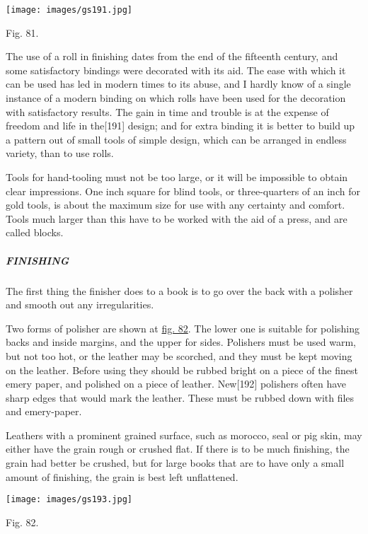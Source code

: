 \documentclass[
]{article}
\begin{document}
\protect\hypertarget{Fig_81}{}{}
\texttt{[image: images/gs191.jpg]}

Fig. 81.

The use of a roll in finishing dates from the end of the fifteenth
century, and some satisfactory bindings were decorated with its aid. The
ease with which it can be used has led in modern times to its abuse, and
I hardly know of a single instance of a modern binding on which rolls
have been used for the decoration with satisfactory results. The gain in
time and trouble is at the expense of freedom and life in
the{\protect\hypertarget{Page_191}{}{{[}191{]}}} design; and for extra
binding it is better to build up a pattern out of small tools of simple
design, which can be arranged in endless variety, than to use rolls.

Tools for hand-tooling must not be too large, or it will be impossible
to obtain clear impressions. One inch square for blind tools, or
three-quarters of an inch for gold tools, is about the maximum size for
use with any certainty and comfort. Tools much larger than this have to
be worked with the aid of a press, and are called blocks.

\hypertarget{finishing}{%
\subparagraph{FINISHING}\label{finishing}}

The first thing the finisher does to a book is to go over the back with
a polisher and smooth out any irregularities.

Two forms of polisher are shown at \protect\hyperlink{Fig_82}{fig. 82}.
The lower one is suitable for polishing backs and inside margins, and
the upper for sides. Polishers must be used warm, but not too hot, or
the leather may be scorched, and they must be kept moving on the
leather. Before using they should be rubbed bright on a piece of the
finest emery paper, and polished on a piece of leather.
New{\protect\hypertarget{Page_192}{}{{[}192{]}}} polishers often have
sharp edges that would mark the leather. These must be rubbed down with
files and emery-paper.

Leathers with a prominent grained surface, such as morocco, seal or pig
skin, may either have the grain rough or crushed flat. If there is to be
much finishing, the grain had better be crushed, but for large books
that are to have only a small amount of finishing, the grain is best
left unflattened.

\protect\hypertarget{Fig_82}{}{}
\texttt{[image: images/gs193.jpg]}

Fig. 82.
\end{document}
